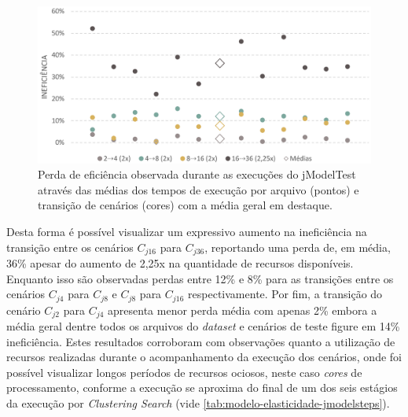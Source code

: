 \documentclass[english,brazilian]{UNISINOSmonografia} %
\newcommand\defaultFigureWidth{0.9}
\begin{document}
\begin{figure}[bt]
	\centering%
	\begin{minipage}{\defaultFigureWidth\textwidth}
		\caption{Perda de eficiência observada durante as execuções do jModelTest através das médias dos tempos de execução por arquivo (pontos) e transição de cenários (cores) com a média geral em destaque.}
		\label{fig:results-jmodel-eficiencia}
		\vspace{1ex}
		\includegraphics[width=\textwidth]{results-jmodel-eficiencia}
	\end{minipage}
\end{figure}



Desta forma é possível visualizar um expressivo aumento na ineficiência na transição entre os cenários $C_{j16}$ para $C_{j36}$, reportando uma perda de, em média, 36\% apesar do aumento de 2,25x na quantidade de recursos disponíveis.
%
Enquanto isso são observadas perdas entre 12\% e 8\% para as transições entre os cenários $C_{j4}$ para $C_{j8}$ e $C_{j8}$ para $C_{j16}$ respectivamente.
%
Por fim, a transição do cenário $C_{j2}$ para $C_{j4}$ apresenta menor perda média com apenas 2\% embora a média geral dentre todos os arquivos do \textit{dataset} e cenários de teste figure em 14\% ineficiência.
%
Estes resultados corroboram com observações quanto a utilização de recursos realizadas durante o acompanhamento da execução dos cenários, onde foi possível visualizar longos períodos de recursos ociosos, neste caso \textit{cores} de processamento, conforme a execução se aproxima do final de um dos seis estágios da execução por \textit{Clustering Search} (vide \autoref{tab:modelo-elasticidade-jmodelsteps}).
\end{document}
